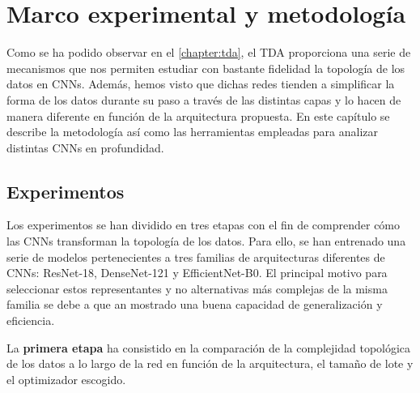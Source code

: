 
\chapter{Marco experimental y metodología}
\label{chapter:methodology}

Como se ha podido observar en el \autoref{chapter:tda}, el TDA proporciona una serie de mecanismos que nos permiten estudiar con bastante fidelidad la topología de los datos en CNNs. Además, hemos visto que dichas redes tienden a simplificar la forma de los datos durante su paso a través de las distintas capas y lo hacen de manera diferente en función de la arquitectura propuesta. En este capítulo se describe la metodología así como las herramientas empleadas para analizar distintas CNNs en profundidad.

\section{Experimentos}

Los experimentos se han dividido en tres etapas con el fin de comprender cómo las CNNs transforman la topología de los datos. Para ello, se han entrenado una serie de modelos pertenecientes a tres familias de arquitecturas diferentes de CNNs: ResNet-18, DenseNet-121 y EfficientNet-B0. El principal motivo para seleccionar estos representantes y no alternativas más complejas de la misma familia se debe a que an mostrado una buena capacidad de generalización y eficiencia.

La \textbf{primera etapa} ha consistido en la comparación de la complejidad topológica de los datos a lo largo de la red en función de la arquitectura, el tamaño de lote y el optimizador escogido.%
	
